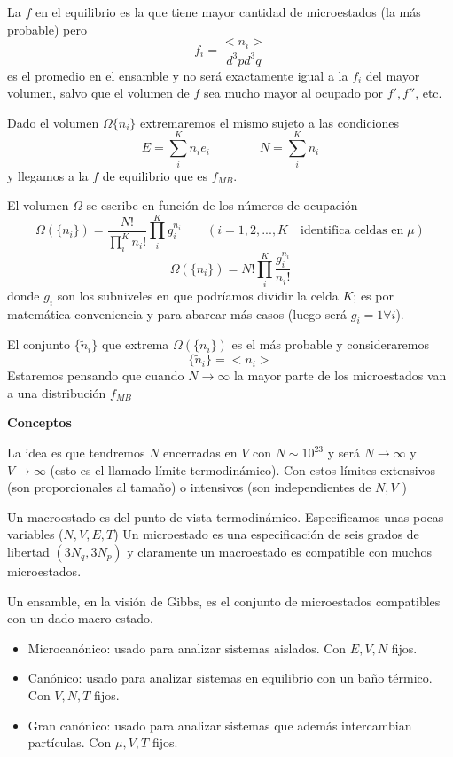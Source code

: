 \documentclass[10pt,oneside]{CBFT_book}
\begin{document}
La $f$ en el equilibrio es la que tiene mayor cantidad de microestados (la más probable) pero 
\[
	\bar{f}_i =  \frac{<n_i>}{d^3p d^3q}
\]
es el promedio en el ensamble y no será exactamente igual a la $f_i$ del mayor volumen, salvo que el volumen de $f$
sea mucho mayor al ocupado por $f',f''$, etc.

Dado el volumen $\Omega \{ n_i\}$ extremaremos el mismo sujeto a las condiciones
\[
	E = \sum_i^K n_i e_i \qquad \qquad N = \sum_i^K n_i
\]
y llegamos a la $f$ de equilibrio que es $f_{MB}$.

El volumen $\Omega$ se escribe en función de los números de ocupación
\[
	\Omega \left( \{ n_i \} \right) = 
	\frac{N!}{\prod_i^K n_i!} \prod_i^K g_i^{n_i} \qquad 
	(i=1,2,...,K \quad \text{identifica celdas en}\;\mu )
\]
\[
	\Omega \left( \{ n_i \} \right) = N! \prod_i^K \frac{g_i^{n_i}}{n_i!}
\]
donde $g_i$ son los subniveles en que podríamos dividir la celda $K$; es por matemática conveniencia y para abarcar 
más casos (luego será $g_i=1 \forall i$).

El conjunto $\{ \tilde{n}_i\}$ que extrema $\Omega \left( \{ n_i \} \right)$ es el más probable y consideraremos
\[
	\{ \tilde{n}_i\} = < n_i >
\]
Estaremos pensando que cuando $N \to \infty$ la mayor parte de los microestados van a una distribución $f_{MB}$

{\bf Conceptos}

La idea  es que tendremos $N$ encerradas en $V$ con $N \sim 10^23$ y será $N \to \infty$ y $V \to \infty$ (esto
es el llamado límite termodinámico).
Con estos límites extensivos (son proporcionales al tamaño) o intensivos (son independientes de $N,V$ )

Un macroestado es del punto de vista termodinámico. Especificamos unas pocas variables ($N,V,E,T$)
Un microestado es una especificación de seis grados de libertad $(3 N_q, 3 N_p)$ y claramente un macroestado
es compatible con muchos microestados.

Un ensamble, en la visión de Gibbs, es el conjunto de microestados compatibles con un dado macro estado.

\begin{itemize}
 \item Microcanónico: usado para analizar sistemas aislados. Con $E,V,N$ fijos.
 \item Canónico: usado para analizar sistemas en equilibrio con un baño térmico. Con $V,N,T$ fijos.
 \item Gran canónico: usado para analizar sistemas que además intercambian partículas. Con $\mu,V,T$ fijos.
\end{itemize}
\end{document}
